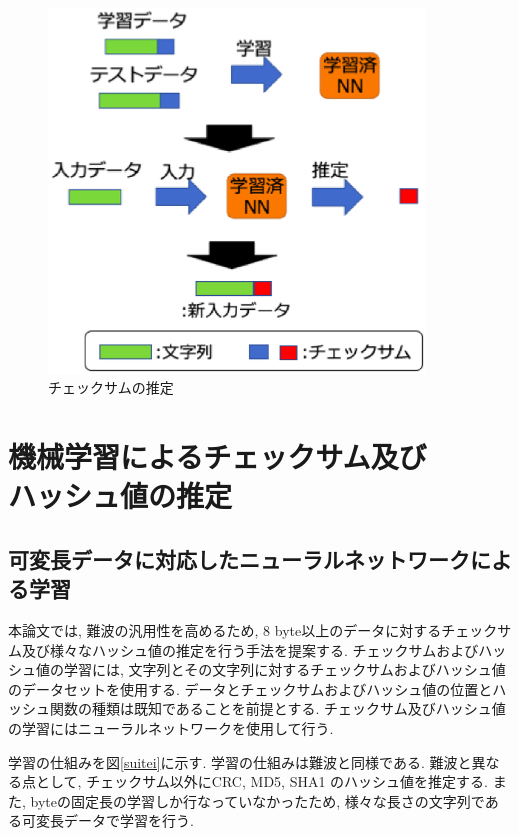 \documentclass[11pt]{jbook}
\begin{document}
\begin{figure}[htbp]
\begin{center}
\includegraphics[width=100mm]{nambahantei.eps}
\caption{チェックサムの推定}
\label{hantei}
\end{center}
\end{figure}

\chapter{機械学習によるチェックサム及び \\ ハッシュ値の推定}

\section{可変長データに対応したニューラルネットワークによる学習}

本論文では, 難波\cite{namba}の汎用性を高めるため, 8 byte以上のデータに対するチェックサム及び様々なハッシュ値の推定を行う手法を提案する.
チェックサムおよびハッシュ値の学習には, 文字列とその文字列に対するチェックサムおよびハッシュ値のデータセットを使用する.
データとチェックサムおよびハッシュ値の位置とハッシュ関数の種類は既知であることを前提とする.
チェックサム及びハッシュ値の学習にはニューラルネットワークを使用して行う.

学習の仕組みを図\ref{suitei}に示す.
学習の仕組みは難波\cite{namba}と同様である.
難波\cite{namba}と異なる点として, チェックサム以外にCRC\cite{crc}, MD5\cite{md5}, SHA1\cite{sha1} のハッシュ値を推定する.
また, \cite{namba} byteの固定長の学習しか行なっていなかったため, 様々な長さの文字列である可変長データで学習を行う.
\end{document}
